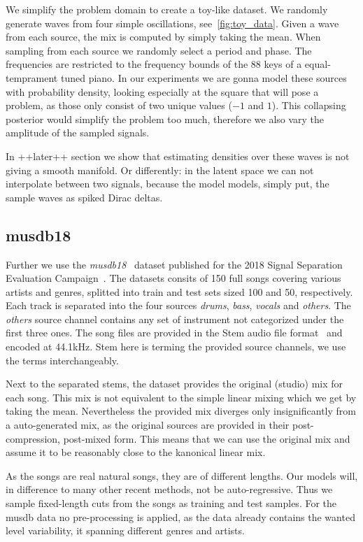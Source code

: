 We simplify the problem domain to create a toy-like dataset. We randomly generate waves from four simple oscillations, see~\cref{fig:toy_data}. Given a wave from each source, the mix is computed by simply taking the mean. When sampling from each source we randomly select a period and phase. The frequencies are restricted to the frequency bounds of the 88 keys of a equal-temprament tuned piano. In our experiments we are gonna model these sources with probability density, looking especially at the square that will pose a problem, as those only consist of two unique values (\(-1\) and \(1\)). This collapsing posterior would simplify the problem too much, therefore we also vary the amplitude of the sampled signals.

In ++later++ section we show that estimating densities over these waves is not giving a smooth manifold. Or differently: in the latent space we can not interpolate between two signals, because the model models, simply put, the sample waves as spiked Dirac deltas.


\subsection{musdb18}
Further we use the \emph{musdb18}~\cite{rafiiMUSDB182017} dataset published for the 2018 Signal Separation Evaluation Campaign~\cite{stoter20182018}. The datasets consits of 150 full songs covering various artists and genres, splitted into train and test sets sized 100 and 50, respectively. Each track is separated into the four sources \emph{drums}, \emph{bass}, \emph{vocals} and \emph{others}. The \emph{others} source channel contains any set of instrument not categorized under the first three ones. The song files are provided in the Stem audio file format~\cite{nativeinstrumentsStem} and encoded at 44.1kHz. Stem here is terming the provided source channels, we use the terms interchangeably.

Next to the separated stems, the dataset provides the original (studio) mix for each song. This mix is not equivalent to the simple linear mixing which we get by taking the mean. Nevertheless the provided mix diverges only insignificantly from a auto-generated mix, as the original sources are provided in their post-compression, post-mixed form. This means that we can use the original mix and assume it to be reasonably close to the kanonical linear mix.

As the songs are real natural songs, they are of different lengths. Our models will, in difference to many other recent methods, not be auto-regressive. Thus we sample fixed-length cuts from the songs as training and test samples. For the musdb data no pre-processing is applied, as the data already contains the wanted level variability, it spanning different genres and artists.

